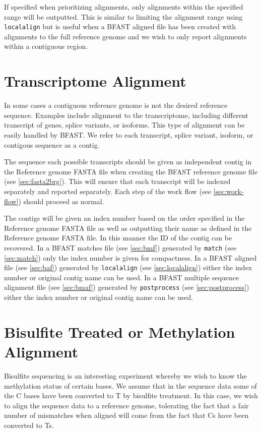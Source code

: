 \documentclass[a4paper,12pt]{book}
\newcommand{\TT}[1]{{\tt #1}} %
\newcommand{\RGFF}{Reference genome FASTA file}
\newcommand{\BRGF}{BFAST reference genome file} %
\newcommand{\BMF}{BFAST matches file} %
\newcommand{\BAF}{BFAST aligned file} %
\newcommand{\BMAF}{BFAST multiple sequence alignment file} %
\begin{document}
If specified when prioritizing alignments, only alignments within the specified range will be outputted.
This is similar to limiting the alignment range using \TT{localalign} but is useful when a \BAF{} has been created with alignments to the full reference genome and we wish to only report alignments within a contiguous region.

\section{Transcriptome Alignment}
\label{sec:transcriptome}
In some cases a contiguous reference genome is not the desired reference sequence.
Examples include alignment to the transcriptome, including different transcript of genes, splice variants, or isoforms.
This type of alignment can be easily handled by BFAST.
We refer to each transcript, splice variant, isoform, or contigous sequence as a contig.

The sequence each possible transcripts should be given as independent contig in the \RGFF{} when creating the \BRGF{} (see \autoref{sec:fasta2brg}).
This will ensure that each transcript will be indexed separately and reported separately.
Each step of the work flow (see \autoref{sec:work-flow}) should proceed as normal.

The contigs will be given an index number based on the order specified in the \RGFF{} as well as outputting their name as defined in the \RGFF{}.
In this manner the ID of the contig can be recovered.
In a \BMF{} (see \autoref{sec:bmf}) generated by \TT{match} (see \autoref{sec:match}) only the index number is given for compactness.
In a \BAF{} (see \autoref{sec:baf}) generated by \TT{localalign} (see \autoref{sec:localalign}) either the index number or original contig name can be used.
In a \BMAF{} (see \autoref{sec:bmaf}) generated by \TT{postprocess} (see \autoref{sec:postprocess}) either the index number or original contig name can be used.

\section{Bisulfite Treated or Methylation Alignment}
Bisulfite sequencing is an interesting experiment whereby we wish to know the methylation status of certain bases.
We assume that in the sequence data some of the C bases have been converted to T by bisulfite treatment.
In this case, we wish to align the sequence data to a reference genome, tolerating the fact that a fair number of mismatches when aligned will come from the fact that Cs have been converted to Ts.
\end{document}

